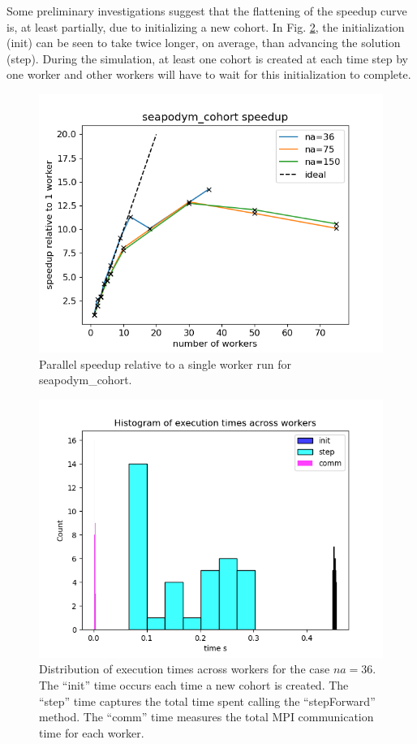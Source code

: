 \documentclass[a4paper,oneside,12pt]{article}
\begin{document}
Some preliminary investigations suggest that the flattening of the speedup curve is, at least partially, due to
initializing a new cohort. In Fig. \ref{fig:seapodym_times}, the initialization (init) can be seen to 
take twice longer, on average, than advancing the solution (step). During the simulation, at least one cohort is created at each time 
step by one worker and other workers will have to wait for this initialization to complete. 

\begin{figure}
    \includegraphics[width=15cm]{results_seapodym/seapodym_cohort_speedup.png}
    \caption{Parallel speedup relative to a single worker run for seapodym\_cohort.}
    \label{fig:seapodym_scalability}
\end{figure}

\begin{figure}
    \includegraphics[width=15cm]{results_seapodym/seapodym_cohort_times.png}
    \caption{Distribution of execution times across workers for the case $na = 36$. The ``init'' time occurs each time a new cohort is created.
    The ``step'' time captures the total time spent calling the ``stepForward'' method. The ``comm'' time measures the total MPI communication time for each worker.
    }
    \label{fig:seapodym_times}
\end{figure}
\end{document}
